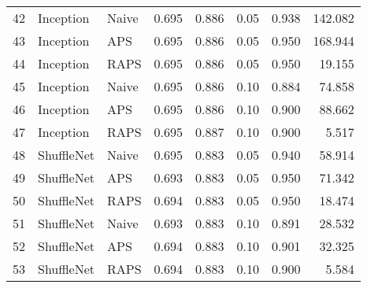 \begin{tabular}{lllrrrrr}
42 &    Inception &     Naive &  0.695 &  0.886 &   0.05 &     0.938 &  142.082 \\
43 &    Inception &       APS &  0.695 &  0.886 &   0.05 &     0.950 &  168.944 \\
44 &    Inception &      RAPS &  0.695 &  0.886 &   0.05 &     0.950 &   19.155 \\
45 &    Inception &     Naive &  0.695 &  0.886 &   0.10 &     0.884 &   74.858 \\
46 &    Inception &       APS &  0.695 &  0.886 &   0.10 &     0.900 &   88.662 \\
47 &    Inception &      RAPS &  0.695 &  0.887 &   0.10 &     0.900 &    5.517 \\
48 &   ShuffleNet &     Naive &  0.695 &  0.883 &   0.05 &     0.940 &   58.914 \\
49 &   ShuffleNet &       APS &  0.693 &  0.883 &   0.05 &     0.950 &   71.342 \\
50 &   ShuffleNet &      RAPS &  0.694 &  0.883 &   0.05 &     0.950 &   18.474 \\
51 &   ShuffleNet &     Naive &  0.693 &  0.883 &   0.10 &     0.891 &   28.532 \\
52 &   ShuffleNet &       APS &  0.694 &  0.883 &   0.10 &     0.901 &   32.325 \\
53 &   ShuffleNet &      RAPS &  0.694 &  0.883 &   0.10 &     0.900 &    5.584 \\
\bottomrule
\end{tabular}
